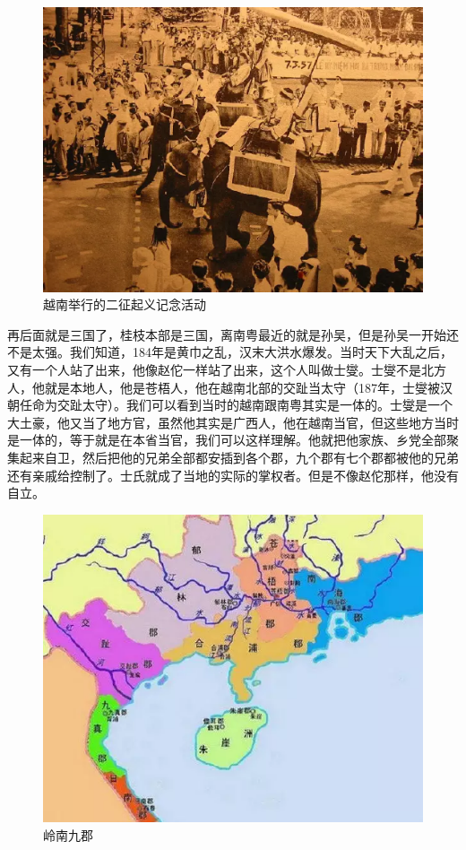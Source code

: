 \begin{figure}
	\centering
	\includegraphics[width=\textwidth]{images/image-14}
	\caption{越南举行的二征起义记念活动}
\end{figure}

再后面就是三国了，桂枝本部是三国，离南粤最近的就是孙吴，但是孙吴一开始还不是太强。我们知道，184年是黄巾之乱，汉末大洪水爆发。当时天下大乱之后，又有一个人站了出来，他像赵佗一样站了出来，这个人叫做士燮。士燮不是北方人，他就是本地人，他是苍梧人，他在越南北部的交趾当太守（187年，士燮被汉朝任命为交趾太守）。我们可以看到当时的越南跟南粤其实是一体的。士燮是一个大土豪，他又当了地方官，虽然他其实是广西人，他在越南当官，但这些地方当时是一体的，等于就是在本省当官，我们可以这样理解。他就把他家族、乡党全部聚集起来自卫，然后把他的兄弟全部都安插到各个郡，九个郡有七个郡都被他的兄弟还有亲戚给控制了。士氏就成了当地的实际的掌权者。但是不像赵佗那样，他没有自立。

\begin{figure}
	\centering
	\includegraphics[width=\textwidth]{images/image-15}
	\caption{岭南九郡}
\end{figure}

